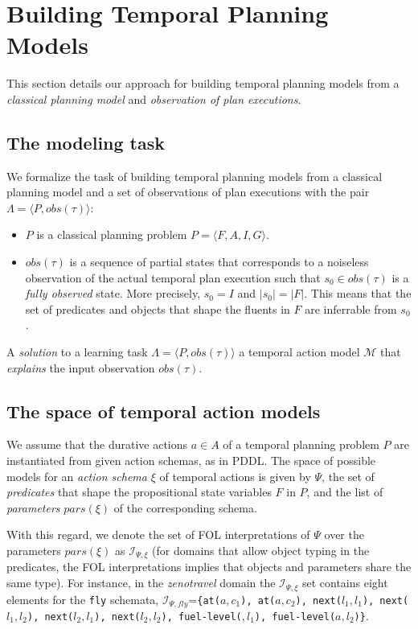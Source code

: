 \documentclass[letterpaper]{article} %
\newcommand{\tup}[1]{{\langle #1 \rangle}}
\begin{document}
\section{Building Temporal Planning Models}
\label{sec:learning}
This section details our approach for building temporal planning models from a {\em classical planning model} and {\em observation of plan executions}.

\subsection{The modeling task}
We formalize the task of building temporal planning models from a classical planning model and a set of observations of plan executions with the pair $\Lambda=\tup{P,obs(\tau)}$:
\begin{itemize}
\item $P$ is a classical planning problem $P=\tup{F,A,I,G}$.
\item $obs(\tau)$ is a sequence of partial states that corresponds to a noiseless observation of the actual temporal plan execution such that $s_0\in obs(\tau)$ is a {\em fully observed} state. More precisely, $s_0=I$ and $|s_0|=|F|$. This means that the set of predicates and objects that shape the fluents in $F$ are inferrable from $s_0$. 
\end{itemize}

A {\em solution} to a learning task $\Lambda=\tup{P,obs(\tau)}$ a temporal action model $\mathcal{M}$ that {\em explains} the input observation $obs(\tau)$.

\subsection{The space of temporal action models}
We assume that the durative actions $a\in A$ of a temporal planning problem $P$ are instantiated from given action schemas, as in PDDL. The space of possible models for an {\em action schema} $\xi$ of temporal actions is given by $\Psi$, the set of {\em predicates} that shape the propositional state variables $F$ in $P$, and the list of {\em parameters} $pars(\xi)$ of the corresponding schema.

With this regard, we denote the set of FOL interpretations of $\Psi$ over the parameters $pars(\xi)$ as ${\mathcal I}_{\Psi,\xi}$ (for domains that allow object typing in the predicates, the FOL interpretations implies that objects and parameters share the same type). For instance, in the {\em zenotravel} domain the ${\mathcal I}_{\Psi,\xi}$ set contains eight elements for the {\small\tt fly} schemata, ${\mathcal I}_{\Psi,fly}$={\small\tt\{at($a,c_1$), at($a,c_2$), next($l_1,l_1$), next($l_1,l_2$), next($l_2,l_1$), next($l_2,l_2$), fuel-level($,l_1$), fuel-level($a,l_2$)\}}. 
\end{document}
